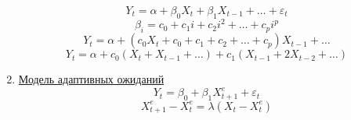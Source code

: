 \documentclass[a4paper, 12pt]{article}
\begin{document}
\begin{enumerate}
    \[Y_t = \alpha + \beta_0 X_t + \beta_1 X_{t - 1} + \ldots + \varepsilon_t\]
    \[\beta_i = c_0 + c_1 i + c_2 i^2 + \ldots + c_p i^p\]
    \[Y_t = \alpha + (c_0 X_t + c_0 + c_1 + c_2 + \ldots + c_p) X_{t - 1} + \ldots\]
    \[Y_t = \alpha + c_0 (X_t + X_{t - 1} + \ldots) + c_1 (X_{t - 1} + 2X_{t - 2} + \ldots)\]
    
    \item \underline{Модель адаптивных ожиданий}
    \[Y_t = \beta_0 + \beta_1 X_{t + 1}^{e} + \varepsilon_t\]
    \[X_{t + 1}^e - X_t^e = \lambda (X_t - X_t^e)\] 
\end{enumerate}
\end{document}

